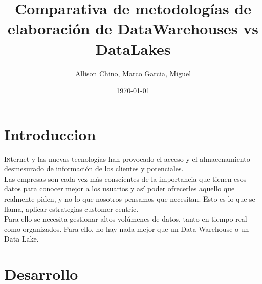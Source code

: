 \documentclass[twoside,twocolumn]{article}
\title{Comparativa de metodologías de elaboración de DataWarehouses vs DataLakes}
\author{Allison Chino, Marco Garcia, Miguel}
\date{\today}
\begin{document}
\maketitle


\section{Introduccion}
\lettrine[nindent=0em,lines=3]{I}nternet y las nuevas tecnologías han provocado el acceso y el almacenamiento desmesurado de información de los clientes y potenciales.\\[0.1in]
Las empresas son cada vez más conscientes de la importancia que tienen esos datos para conocer mejor a los usuarios y así poder ofrecerles aquello que realmente piden, y no lo que nosotros pensamos que necesitan. Esto es lo que se llama, aplicar estrategias customer centric.\\[0.1in]
Para ello se necesita gestionar altos volúmenes de datos, tanto en tiempo real como organizados. Para ello, no hay nada mejor que un Data Warehouse o un Data Lake.


\section{Desarrollo}
\end{document}
